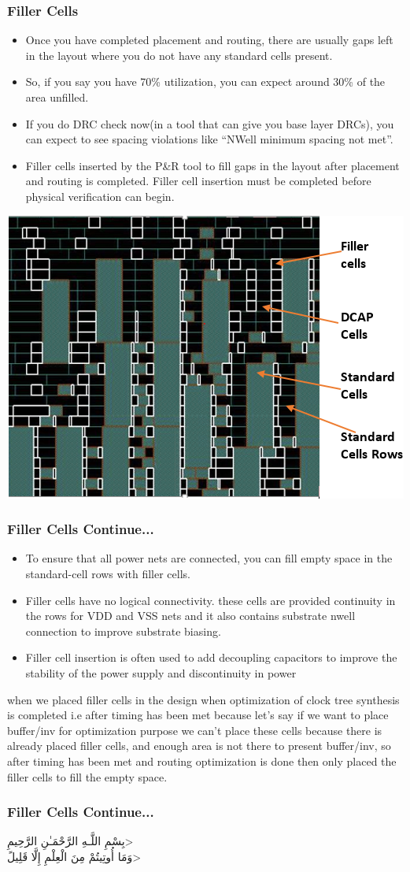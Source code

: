 \documentclass{beamer}
\begin{document}
\begin{frame}
	\frametitle{Filler Cells}
	\begin{itemize}
		\item Once you have completed placement and routing, there are usually gaps left in the layout where you do not have any standard cells present.
		\item So, if you say you have 70\% utilization, you can expect around 30\% of the area unfilled.
		\item If you do DRC check now(in a tool that can give you base layer DRCs), you can expect to see spacing violations like “NWell minimum spacing not met”.
		\item Filler cells inserted by the P\&R tool to fill gaps in the layout after placement and routing is completed. Filler cell insertion must be completed before physical verification can begin.
	\end{itemize}
		\begin{center}
		\includegraphics[width=0.3 \textwidth]{Filler} 
	\end{center}
\end{frame}	
	\begin{frame}
		\frametitle{Filler Cells Continue...}
		\begin{itemize}	
			\item To ensure that all power nets are connected, you can fill empty space in the standard-cell rows with filler cells.
			\item Filler cells have no logical connectivity. these cells are provided continuity in the rows for VDD and VSS nets and it also contains substrate nwell connection to improve substrate biasing.
			\item Filler cell insertion is often used to add decoupling capacitors to improve the stability of the power supply and discontinuity in power
		\end{itemize}
		\begin{alertblock}{when we placed filler cells in the design}
when optimization of clock tree synthesis is completed i.e after timing has been met because let's say if we want to place buffer/inv for optimization purpose we can't place these cells because there is already placed filler cells, and enough area is not there to present buffer/inv, so after timing has been met and routing optimization is done then only placed the filler cells to fill the empty space.
	\end{alertblock}
	\end{frame}	
	
	\begin{frame}
		\frametitle{Filler Cells Continue...}
	\begin{center}
		\<بِسْمِ اللَّـهِ الرَّحْمَـٰنِ الرَّحِيمِ> \\
		 \<وَمَا أُوتِيتُمْ مِنَ الْعِلْمِ إِلَّا قَلِيلً>

	\end{center}
	\end{frame}	
\end{document}
